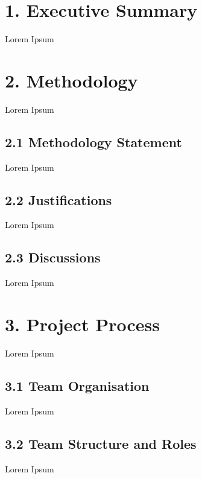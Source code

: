 \documentclass[11pt]{article}
\begin{document}
\newpage





\tableofcontents
\newpage






\setcounter{secnumdepth}{0}

\section{1. Executive Summary}
Lorem Ipsum



\section{2. Methodology}
Lorem Ipsum

\subsection{2.1 Methodology Statement}
Lorem Ipsum

\subsection{2.2 Justifications}
Lorem Ipsum

\subsection{2.3 Discussions}
Lorem Ipsum



\section{3. Project Process}
Lorem Ipsum

\subsection{3.1 Team Organisation}
Lorem Ipsum

\subsection{3.2 Team Structure and Roles}
Lorem Ipsum
\end{document}
